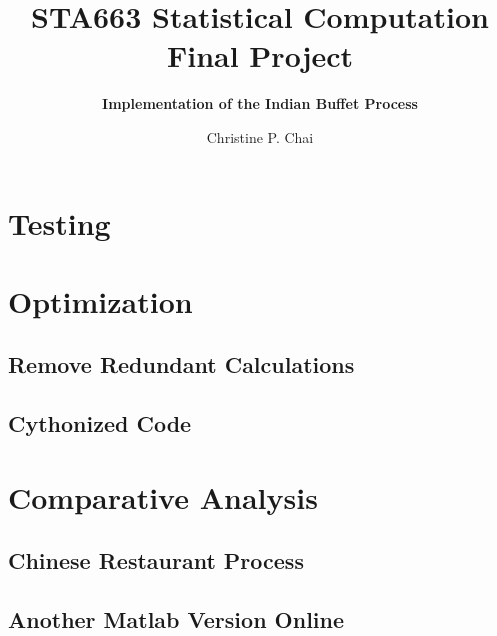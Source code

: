 \documentclass[12pt]{article}
\begin{document}
\vspace{-1in}
\title{\bf STA663 Statistical Computation Final Project}
\author{\bf Implementation of the Indian Buffet Process}
\date{Christine P. Chai}
\maketitle 
\vspace{-0.5in}





\section{Testing}

\section{Optimization}

\subsection{Remove Redundant Calculations}

\subsection{Cythonized Code}

\section{Comparative Analysis}

\subsection{Chinese Restaurant Process}

\subsection{Another Matlab Version Online}
\end{document}
